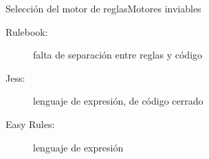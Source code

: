 \documentclass[10pt]{beamer}
\begin{document}
\begin{frame}{Selección del motor de reglas}{Motores inviables}
    \begin{description}
        \item [Rulebook:] falta de separación entre reglas y código
        \item [Jess:] lenguaje de expresión, de código cerrado
        \item [Easy Rules:] lenguaje de expresión
    \end{description}
\end{frame}

\end{document}
